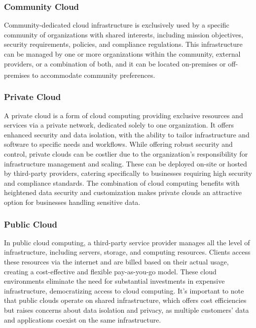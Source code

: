 \subsubsection{Community Cloud}
Community-dedicated cloud infrastructure is exclusively used by a specific community of
organizations with shared interests, including mission objectives, security requirements, policies,
and compliance regulations. This infrastructure can be managed by one or more organizations within
the community, external providers, or a combination of both, and it can be located on-premises or
off-premises to accommodate community preferences\textsuperscript{\cite{nist}}.

\subsubsection{Private Cloud}
A private cloud is a form of cloud computing providing exclusive resources and services via a
private network, dedicated solely to one organization. It offers enhanced security and data
isolation, with the ability to tailor infrastructure and software to specific needs and workflows.
While offering robust security and control, private clouds can be costlier due to the organization's
responsibility for infrastructure management and scaling. These can be deployed on-site or hosted by
third-party providers, catering specifically to businesses requiring high security and compliance
standards. The combination of cloud computing benefits with heightened data security and
customization makes private clouds an attractive option for businesses handling sensitive data.

\subsubsection{Public Cloud}
In public cloud computing, a third-party service provider manages all the level of infrastructure,
including servers, storage, and computing resources. Clients access these resources via the internet
and are billed based on their actual usage, creating a cost-effective and flexible pay-as-you-go
model. These cloud environments eliminate the need for substantial investments in expensive
infrastructure, democratizing access to cloud computing. It's important to note that public clouds
operate on shared infrastructure, which offers cost efficiencies but raises concerns about data
isolation and privacy, as multiple customers' data and applications coexist on the same
infrastructure.

